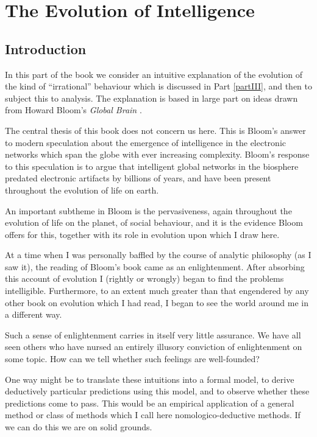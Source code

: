 
\part{The Evolution of Intelligence}\label{partI}


\chapter{Introduction}

In this part of the book we consider an intuitive explanation of the evolution of the kind of ``irrational'' behaviour which is discussed in Part \ref{partIII}, and then to subject this to analysis.
The explanation is based in large part on ideas drawn from Howard Bloom's \emph{Global Brain} \cite{bloomBRAIN}.

The central thesis of this book does not concern us here.
This is Bloom's answer to modern speculation about the emergence of intelligence in the electronic networks which span the globe with ever increasing complexity.
Bloom's response to this speculation is to argue that intelligent global networks in the biosphere predated electronic artifacts by billions of years, and have been present throughout the evolution of life on earth.

An important subtheme in Bloom is the pervasiveness, again throughout the evolution of life on the planet, of social behaviour, and it is the evidence Bloom offers for this, together with its role in evolution upon which I draw here.

At a time when I was personally baffled by the course of analytic philosophy (as I saw it), the reading of Bloom's book came as an enlightenment.
After absorbing this account of evolution I (rightly or wrongly) began to find the problems intelligible.
Furthermore, to an extent much greater than that engendered by any other book on evolution which I had read, I began to see the world around me in a different way.

Such a sense of enlightenment carries in itself very little assurance.
We have all seen others who have nursed an entirely illusory conviction of enlightenment on some topic.
How can we tell whether such feelings are well-founded?

One way might be to translate these intuitions into a formal model, to derive deductively particular predictions using this model, and to observe whether these predictions come to pass.
This would be an empirical application of a general method or class of methods which I call here nomologico-deductive methods.
If we can do this we are on solid grounds.

